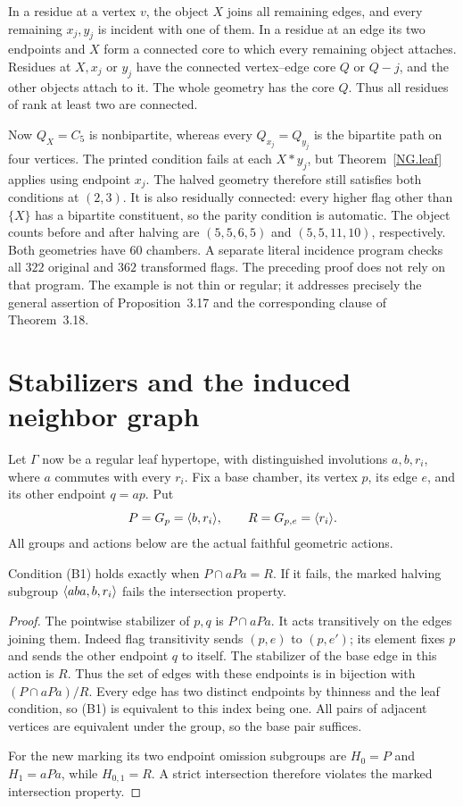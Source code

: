 In a residue at a vertex $v$, the object $X$ joins all remaining
edges, and every remaining $x_j,y_j$ is incident with one of them.
In a residue at an edge its two endpoints and $X$ form a connected
core to which every remaining object attaches. Residues at $X,x_j$
or $y_j$ have the connected vertex--edge core $Q$ or $Q-j$, and
the other objects attach to it. The whole geometry has the core
$Q$. Thus all residues of rank at least two are connected.

Now $Q_X=C_5$ is nonbipartite, whereas every $Q_{x_j}=Q_{y_j}$
is the bipartite path on four vertices. The printed condition fails
at each $X*y_j$, but Theorem~\ref{NG.leaf} applies using endpoint $x_j$.
The halved geometry therefore still satisfies both conditions at
$(2,3)$. It is also residually connected: every higher flag other
than $\{X\}$ has a bipartite constituent, so the parity condition
is automatic. The object counts before and after halving are
$(5,5,6,5)$ and $(5,5,11,10)$, respectively. Both geometries have
$60$ chambers. A separate literal incidence program checks all
$322$ original and $362$ transformed flags. The preceding proof
does not rely on that program. The example is not thin or regular;
it addresses precisely the general assertion of Proposition~3.17
and the corresponding clause of Theorem~3.18.

\section{Stabilizers and the induced neighbor graph}
Let $\Gamma$ now be a regular leaf hypertope, with distinguished
involutions $a,b,r_i$, where $a$ commutes with every $r_i$. Fix a
base chamber, its vertex $p$, its edge $e$, and its other endpoint
$q=ap$. Put
\[
 P=G_p=\langle b,r_i\rangle,\qquad R=G_{p,e}=\langle r_i\rangle.
\]
All groups and actions below are the actual faithful geometric actions.

\begin{proposition}\label{NG.stabilizer}
Condition (B1) holds exactly when $P\cap aPa=R$. If it fails,
the marked halving subgroup $\langle aba,b,r_i\rangle$ fails the intersection
property.
\end{proposition}
\begin{proof}
The pointwise stabilizer of $p,q$ is $P\cap aPa$. It acts
transitively on the edges joining them. Indeed flag transitivity
sends $(p,e)$ to $(p,e')$; its element fixes $p$ and sends the
other endpoint $q$ to itself. The stabilizer of the base edge in
this action is $R$. Thus the set of edges with these endpoints
is in bijection with $(P\cap aPa)/R$. Every edge has two distinct
endpoints by thinness and the leaf condition, so (B1) is equivalent
to this index being one. All pairs of adjacent vertices are
equivalent under the group, so the base pair suffices.

For the new marking its two endpoint omission subgroups are
$H_0=P$ and $H_1=aPa$, while $H_{0,1}=R$. A strict intersection
therefore violates the marked intersection property.
\end{proof}

